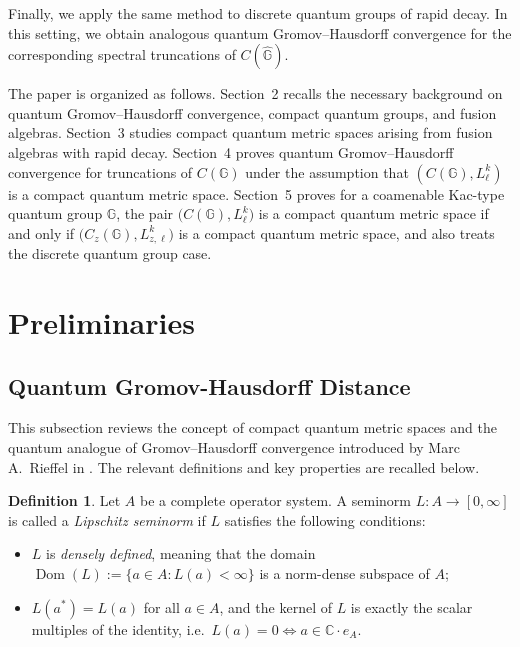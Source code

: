 \documentclass[12pt, reqno]{amsart}
\theoremstyle{definition}
\newtheorem{definition}[theorem]{Definition}
\theoremstyle{remark}
\numberwithin{equation}{section}
\begin{document}
Finally, we apply the same method to discrete quantum groups of rapid decay. In this setting, we obtain analogous quantum Gromov--Hausdorff convergence for the corresponding spectral truncations of $C(\widehat{\mathbb{G}})$.

The paper is organized as follows. Section~2 recalls the necessary background on quantum Gromov--Hausdorff convergence, compact quantum groups, and fusion algebras. Section~3 studies compact quantum metric spaces arising from fusion algebras with rapid decay. Section~4 proves quantum Gromov--Hausdorff convergence for truncations of $C(\mathbb{G})$ under the assumption that $(C(\mathbb{G}),L_{\ell}^{k})$ is a compact quantum metric space. Section~5 proves for a coamenable Kac-type quantum group $\mathbb{G}$, the pair
$\bigl(C(\mathbb{G}), L_{\ell}^{k}\bigr)$ is a compact quantum metric space
if and only if $\bigl(C_{z}(\mathbb{G}), L_{z,\ell}^{k}\bigr)$ is a compact
quantum metric space,
 and also treats the discrete quantum group case.













\section{Preliminaries}

\subsection{Quantum Gromov-Hausdorff Distance}
This subsection reviews the concept of compact quantum metric spaces 
and the quantum analogue of Gromov--Hausdorff convergence introduced 
by Marc A.~Rieffel in \cite{9}. The relevant definitions and key 
properties are recalled below.

\begin{definition}\label{Definition2.1}
Let $A$ be a complete operator system. A seminorm 
$L \colon A \to [0,\infty]$ is called a \emph{Lipschitz seminorm} 
if $L$ satisfies the following conditions:
\begin{itemize}
    \item[(1)] $L$ is \emph{densely defined}, meaning that the domain 
    $\operatorname{Dom}(L) := \{a \in A : L(a) < \infty\}$ is a 
    norm-dense subspace of $A$;
    
    \item[(2)] $L(a^*) = L(a)$ for all $a \in A$, and the kernel of $L$ 
    is exactly the scalar multiples of the identity, i.e.\ 
    $L(a) = 0 \iff a \in \mathbb{C}\cdot e_A$.
\end{itemize}
\end{definition}
\end{document}
